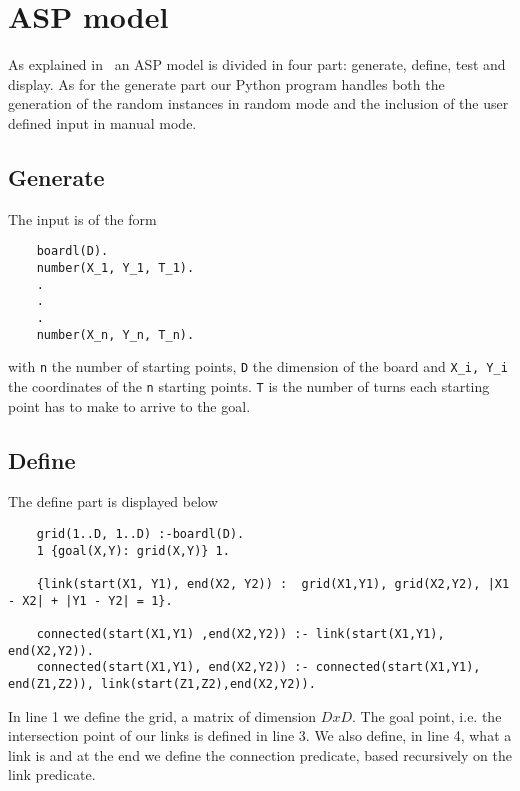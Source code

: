 \section{ASP model}
As explained in~\cite{ClingoGuide} an ASP model is divided in four part: generate, define, test and display.
As for the generate part our Python program handles both the generation of the random instances in random mode and the inclusion of the user defined input in manual mode.
\subsection{Generate}
The input is of the form
\begin{verbatim}
    boardl(D).
    number(X_1, Y_1, T_1).
    .
    .
    .
    number(X_n, Y_n, T_n).
\end{verbatim}
with \texttt{n} the number of starting points, \texttt{D} the dimension of the board and \texttt{X_i, Y_i} the coordinates of the \texttt{n} starting points. \texttt{T} is the number of turns each starting point has to make to arrive to the goal.

\subsection{Define}
The define part is displayed below
\begin{verbatim}
    grid(1..D, 1..D) :-boardl(D).
    1 {goal(X,Y): grid(X,Y)} 1.
    
    {link(start(X1, Y1), end(X2, Y2)) :  grid(X1,Y1), grid(X2,Y2), |X1 - X2| + |Y1 - Y2| = 1}. 
    
    connected(start(X1,Y1) ,end(X2,Y2)) :- link(start(X1,Y1), end(X2,Y2)).
    connected(start(X1,Y1), end(X2,Y2)) :- connected(start(X1,Y1), end(Z1,Z2)), link(start(Z1,Z2),end(X2,Y2)). 
\end{verbatim}

In line 1 we define the grid, a matrix of dimension $DxD$. The goal point, i.e. the intersection point of our links is defined in line 3. We also define, in line 4, what a link is and at the end we define the connection predicate, based recursively on the link predicate.
